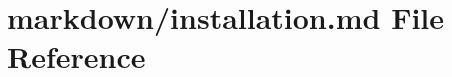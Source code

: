 \hypertarget{installation_8md}{}\section{markdown/installation.md File Reference}
\label{installation_8md}
